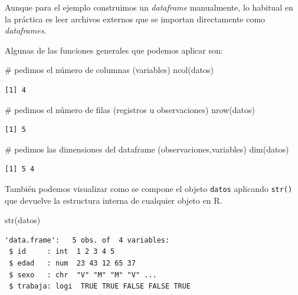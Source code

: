 \documentclass[
  spanish,
  letterpaper,
  DIV=11,
  numbers=noendperiod]{scrreprt}
\newenvironment{Shaded}{\begin{snugshade}}{\end{snugshade}}
\newcommand{\CommentTok}[1]{\textcolor[rgb]{0.37,0.37,0.37}{#1}}
\newcommand{\FunctionTok}[1]{\textcolor[rgb]{0.28,0.35,0.67}{#1}}
\newcommand{\NormalTok}[1]{\textcolor[rgb]{0.00,0.23,0.31}{#1}}
\begin{document}
Aunque para el ejemplo construimos un \emph{dataframe} manualmente, lo
habitual en la práctica es leer archivos externos que se importan
directamente como \emph{dataframes}.

Algunas de las funciones generales que podemos aplicar son:

\begin{Shaded}
\begin{Highlighting}[]
\CommentTok{\# pedimos el número de columnas (variables)}
\FunctionTok{ncol}\NormalTok{(datos)}
\end{Highlighting}
\end{Shaded}

\begin{verbatim}
[1] 4
\end{verbatim}

\begin{Shaded}
\begin{Highlighting}[]
\CommentTok{\# pedimos el número de filas (registros u observaciones)}
\FunctionTok{nrow}\NormalTok{(datos)}
\end{Highlighting}
\end{Shaded}

\begin{verbatim}
[1] 5
\end{verbatim}

\begin{Shaded}
\begin{Highlighting}[]
\CommentTok{\# pedimos las dimensiones del dataframe (observaciones,variables)}
\FunctionTok{dim}\NormalTok{(datos)}
\end{Highlighting}
\end{Shaded}

\begin{verbatim}
[1] 5 4
\end{verbatim}

También podemos visualizar como se compone el objeto \texttt{datos}
aplicando \texttt{str()} que devuelve la estructura interna de cualquier
objeto en R.

\begin{Shaded}
\begin{Highlighting}[]
\FunctionTok{str}\NormalTok{(datos)}
\end{Highlighting}
\end{Shaded}

\begin{verbatim}
'data.frame':   5 obs. of  4 variables:
 $ id     : int  1 2 3 4 5
 $ edad   : num  23 43 12 65 37
 $ sexo   : chr  "V" "M" "M" "V" ...
 $ trabaja: logi  TRUE TRUE FALSE FALSE TRUE
\end{verbatim}
\end{document}
